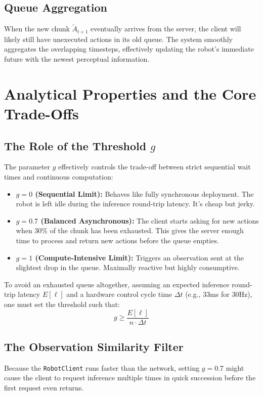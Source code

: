 \documentclass[11pt,a4paper]{article}
\begin{document}
\subsection{Queue Aggregation}
When the new chunk $\tilde{A}_{t+1}$ eventually arrives from the server, the client will likely still have unexecuted actions in its old queue. The system smoothly aggregates the overlapping timesteps, effectively updating the robot's immediate future with the newest perceptual information.

\section{Analytical Properties and the Core Trade-Offs}

\subsection{The Role of the Threshold $g$}
The parameter $g$ effectively controls the trade-off between strict sequential wait times and continuous computation:
\begin{itemize}
    \item \textbf{\boldmath $g = 0$ (Sequential Limit):} Behaves like fully synchronous deployment. The robot is left idle during the inference round-trip latency. It's cheap but jerky.
    \item \textbf{\boldmath $g = 0.7$ (Balanced Asynchronous):} The client starts asking for new actions when 30\% of the chunk has been exhausted. This gives the server enough time to process and return new actions before the queue empties.
    \item \textbf{\boldmath $g = 1$ (Compute-Intensive Limit):} Triggers an observation sent at the slightest drop in the queue. Maximally reactive but highly consumptive.
\end{itemize}

To avoid an exhausted queue altogether, assuming an expected inference round-trip latency $E[\ell]$ and a hardware control cycle time $\Delta t$ (e.g., 33ms for 30Hz), one must set the threshold such that:
\[
    g \ge \frac{E[\ell]}{n \cdot \Delta t}
\]

\subsection{The Observation Similarity Filter}
Because the \texttt{RobotClient} runs faster than the network, setting $g=0.7$ might cause the client to request inference multiple times in quick succession before the first request even returns. 
\end{document}

